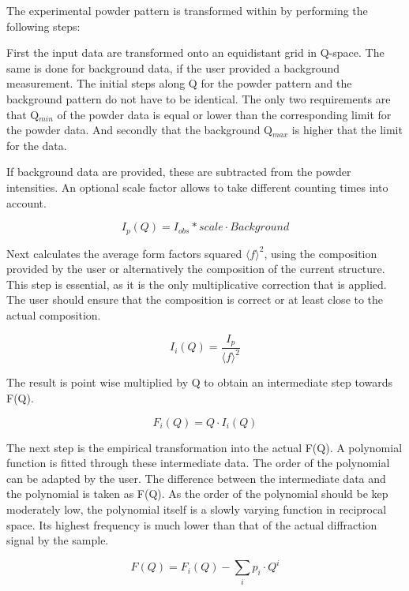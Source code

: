 The experimental powder pattern is transformed within \Discus by performing
the following steps:

First the input data are transformed onto an equidistant grid in Q-space.
The same is done for background data, if the user provided a background 
measurement. The initial steps along Q for the powder pattern and the 
background pattern do not have to be identical. The only two requirements 
are that
Q$_{min}$ of the powder data is equal or lower than the corresponding 
limit for the powder data. And secondly that the background Q$_{max}$
is higher that the limit for the data.

If background data are provided, these are subtracted from the powder
intensities. An optional scale factor allows to take different counting 
times into account.

\begin{equation}
  I_p (Q) = I_{obs} * scale \cdot Background
\end{equation}

Next \Discus calculates the average form factors squared 
$\langle f \rangle^2$, using 
the composition provided by the user or alternatively the composition of the
current structure. This step is essential, as it is the only multiplicative
correction that is applied. The user should ensure that the composition is
correct or at least close to the actual composition.

\begin{equation}
  I_i (Q) = \frac {I_{p}} {\langle f \rangle^2}  
\end{equation}

The result is point wise multiplied by Q to obtain an intermediate step 
towards F(Q). 

\begin{equation}
  F_i (Q) = Q \cdot  I_{i}(Q) 
\end{equation}

The next step is the empirical transformation into the actual F(Q). A 
polynomial function is fitted through these intermediate
data. The order of the polynomial can be adapted by the user. The 
difference between the intermediate data and the polynomial is taken as
F(Q). As the order of the polynomial should be kep moderately low, the 
polynomial itself is a slowly varying function in reciprocal space. Its 
highest frequency is much lower than that of the actual diffraction signal by 
the sample.

\begin{equation}
  F(Q) = F_i (Q) - \sum_i p_i  \cdot Q^i
\end{equation}

